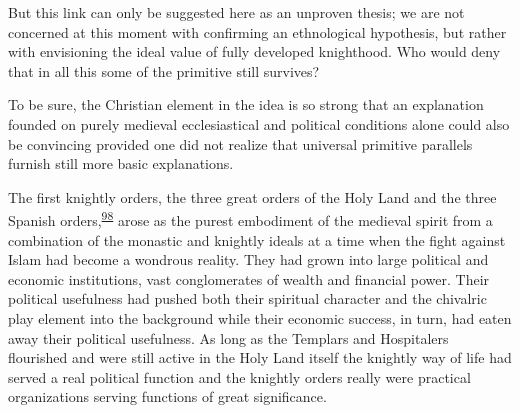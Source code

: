 But this link can only be suggested here as an unproven thesis; we are
not concerned at this moment with confirming an ethnological hypothesis,
but rather with envisioning the ideal value of fully
\protect\hypertarget{10_Chapter_Three__THE_HEROIC_DREAM.xhtmlux5cux23page_92}{}{}developed
knighthood. Who would deny that in all this some of the primitive still
survives?

To be sure, the Christian element in the idea is so strong that an
explanation founded on purely medieval ecclesiastical and political
conditions alone could also be convincing provided one did not realize
that universal primitive parallels furnish still more basic
explanations.

The first knightly orders, the three great orders of the Holy Land and
the three Spanish
orders,\textsuperscript{\protect\hypertarget{10_Chapter_Three__THE_HEROIC_DREAM.xhtmlux5cux23id_1739}{\protect\hyperlink{23_NOTES.xhtmlux5cux23id_1740}{98}}}
arose as the purest embodiment of the medieval spirit from a combination
of the monastic and knightly ideals at a time when the fight against
Islam had become a wondrous reality. They had grown into large political
and economic institutions, vast conglomerates of wealth and financial
power. Their political usefulness had pushed both their spiritual
character and the chivalric play element into the background while their
economic success, in turn, had eaten away their political usefulness. As
long as the Templars and Hospitalers flourished and were still active in
the Holy Land itself the knightly way of life had served a real
political function and the knightly orders really were practical
organizations serving functions of great significance.

